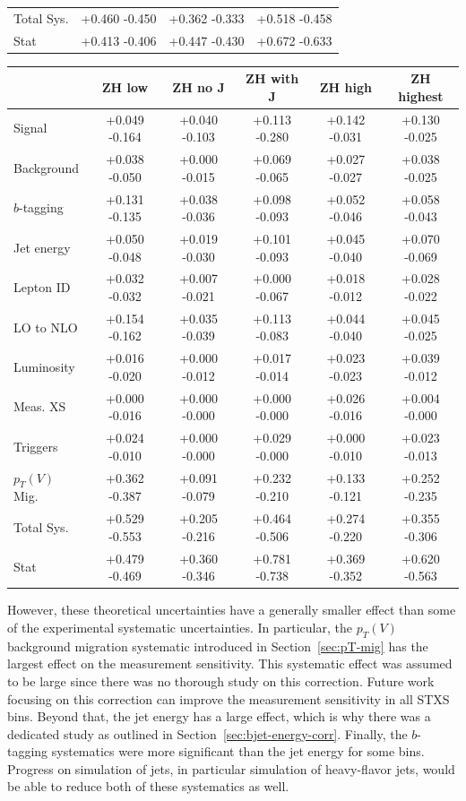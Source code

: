 \begin{table}
\begin{tabular}{|l|c|c|c|}
\hline
Total Sys. & {+0.460} {-0.450} & {+0.362} {-0.333} & {+0.518} {-0.458}\\
Stat & {+0.413} {-0.406} & {+0.447} {-0.430} & {+0.672} {-0.633}\\
\hline
  \end{tabular}
  \begin{tabular}{|l|c|c|c|c|c|}
    \hline
& ZH low & ZH no J & ZH with J & ZH high & ZH highest \\
\hline
Signal & {+0.049} {-0.164} & {+0.040} {-0.103} & {+0.113} {-0.280} & {+0.142} {-0.031} & {+0.130} {-0.025}\\
Background & {+0.038} {-0.050} & {+0.000} {-0.015} & {+0.069} {-0.065} & {+0.027} {-0.027} & {+0.038} {-0.025}\\
\hline
$b$-tagging & {+0.131} {-0.135} & {+0.038} {-0.036} & {+0.098} {-0.093} & {+0.052} {-0.046} & {+0.058} {-0.043}\\
Jet energy & {+0.050} {-0.048} & {+0.019} {-0.030} & {+0.101} {-0.093} & {+0.045} {-0.040} & {+0.070} {-0.069}\\
Lepton ID & {+0.032} {-0.032} & {+0.007} {-0.021} & {+0.000} {-0.067} & {+0.018} {-0.012} & {+0.028} {-0.022}\\
LO to NLO & {+0.154} {-0.162} & {+0.035} {-0.039} & {+0.113} {-0.083} & {+0.044} {-0.040} & {+0.045} {-0.025}\\
Luminosity & {+0.016} {-0.020} & {+0.000} {-0.012} & {+0.017} {-0.014} & {+0.023} {-0.023} & {+0.039} {-0.012}\\
Meas. XS & {+0.000} {-0.016} & {+0.000} {-0.000} & {+0.000} {-0.000} & {+0.026} {-0.016} & {+0.004} {-0.000}\\
Triggers & {+0.024} {-0.010} & {+0.000} {-0.000} & {+0.029} {-0.000} & {+0.000} {-0.010} & {+0.023} {-0.013}\\
$p_T(V)$ Mig. & {+0.362} {-0.387} & {+0.091} {-0.079} & {+0.232} {-0.210} & {+0.133} {-0.121} & {+0.252} {-0.235}\\
\hline
Total Sys. & {+0.529} {-0.553} & {+0.205} {-0.216} & {+0.464} {-0.506} & {+0.274} {-0.220} & {+0.355} {-0.306}\\
Stat & {+0.479} {-0.469} & {+0.360} {-0.346} & {+0.781} {-0.738} & {+0.369} {-0.352} & {+0.620} {-0.563}\\
\hline
  \end{tabular}
  \label{tab:groups}
\end{table}
%
However, these theoretical uncertainties have a generally smaller effect than
some of the experimental systematic uncertainties.
In particular, the $p_T(V)$ background migration systematic introduced in Section~\ref{sec:pT-mig}
has the largest effect on the measurement sensitivity.
This systematic effect was assumed to be large since there was no thorough study on this correction.
Future work focusing on this correction can improve the measurement sensitivity in all STXS bins.
Beyond that, the jet energy has a large effect,
which is why there was a dedicated study as outlined in Section~\ref{sec:bjet-energy-corr}.
Finally, the $b$-tagging systematics were more significant than the jet energy for some bins.
Progress on simulation of jets, in particular simulation of heavy-flavor jets,
would be able to reduce both of these systematics as well.
